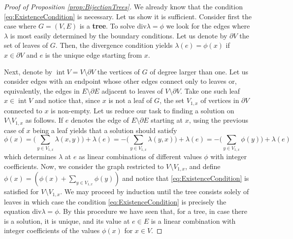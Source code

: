 \documentclass[11pt,a4paper]{amsart}
\DeclareMathOperator{\interior}{int}
\numberwithin{equation}{section}
\theoremstyle{definition}
\begin{document}
\begin{proof}[Proof of Proposition
\ref{prop:BijectionTrees}]

We already know that
the condition
	\eqref{eq:ExistenceCondition}
	is necessary.
	Let us show it is sufficient.
	Consider first the case where
	$G=(V,E)$ is a \textbf{tree}. To solve
	$ \mathrm{div} \lambda = \phi$
	we look for
	the edges where $\lambda$
	is most easily determined by the boundary conditions. Let us denote by $\partial V$ the set of leaves of $G$. Then, the divergence condition yields $\lambda(e)=\phi(x)$ if $x\in \partial V$ and $e$ is the unique edge starting from $x$. 
	
	
	Next, denote by $\interior{V}=V\setminus \partial V$ the vertices of $G$ of degree larger than one. Let us consider edges with an endpoint whose
	other edges connect only to leaves
	or, equivalently, the edges
	in $E\setminus \partial E$ adjacent to leaves
	of $V\setminus \partial V$. Take
	one such leaf $x \in \interior{V}$
	and notice that,
	since $x$ is not a leaf of $G$, the set $V_{1,x}$
	of vertices in $\partial V$ connected to
	$x$ is non-empty.  
	Let us reduce our task to finding
	a solution on $V \setminus V_{1,x}$ as follows.  If $e$ denotes
	the edge of $E \setminus \partial E$
	starting at $x$, using the previous case of $x$ being a leaf yields that a solution should satisfy
	\[ \phi(x)=\bigg(\sum_{y \in V_{1,x}}\lambda(x,y)
	\bigg) +\lambda(e) 
	=-\bigg(\sum_{y \in V_{1,x}}\lambda(y,x)
	\bigg) +\lambda(e)=-\bigg(\sum_{y \in V_{1,x}}\phi(y)
	\bigg) +\lambda(e)\]
	which determines $\lambda$
	at $e$ as linear combinations of different values $\phi$ with integer coefficients. Now, we consider the graph restricted to
	$V\setminus V_{1,x} $, and define
	$\phi(x) =\left(\phi(x)+
	\sum_{y \in V_{1,x}}\phi(y)\right) 
	$
	and notice that
	\eqref{eq:ExistenceCondition}
	is satisfied for $V\setminus V_{1,x}$.
	We may proceed by induction
	until the tree consists solely of leaves
	in which case
	the condition
	\eqref{eq:ExistenceCondition}
	is precisely the
	equation 	 
	$\mathrm{div}\lambda = \phi$. By this procedure
	we have seen that, for a tree, 
	in case there is a solution, it is unique, and its value at $e\in E$ is a linear combination with integer coefficients of the values $\phi(x)$ for $x\in V$.
	

\end{proof}
\end{document}
